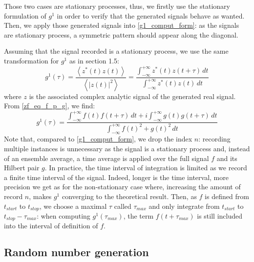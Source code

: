 \documentclass[12pt]{report}
\begin{document}
Those two cases are stationary processes, thus, we firstly use the stationary formulation of $g^1$ in order to verify that the generated signals behave as wanted. Then, we apply those generated signals into \eqref{g1_comput_form}: as the signals are stationary process, a symmetric pattern should appear along the diagonal.

Assuming that the signal recorded is a stationary process, we use the same transformation for $g^1$ as in section 1.5:
\begin{equation}
g^1(\tau) = \frac{\left\langle z^*(t)z(t) \right\rangle}{\left\langle \vert z(t) \vert ^2 \right\rangle} = \frac{\int_{-\infty}^{+\infty} z^*(t)z(t + \tau)\, dt}{\int_{-\infty}^{+\infty} z^*(t)z(t) \, dt}
\end{equation}
where $z$ is the associated complex analytic signal of the generated real signal. From \eqref{zf_eq_f_p_g}, we find:
\begin{equation}
\label{g1_stattionary_computer}
g^1(\tau) = \frac{\int_{-\infty}^{+\infty} f(t)f(t + \tau)\, dt  + i \int_{-\infty}^{+\infty} g(t)g(t + \tau)\, dt}{\int_{-\infty}^{+\infty} f(t)^2 + g(t)^2 \, dt}
\end{equation}
Note that, compared to \eqref{g1_comput_form}, we drop the index $n$: recording multiple instances is unnecessary as the signal is a stationary process and, instead of an ensemble average, a time average is applied over the full signal $f$ and its Hilbert pair $g$. In practice, the time interval of integration is limited as we record a finite time interval of the signal. Indeed, longer is the time interval, more precision we get as for the non-stationary case where, increasing the amount of record $n$, makes $g^1$ converging to the theoretical result. Then, as $f$ is defined from $t_{start}$ to $t_{stop}$, we choose a maximal $\tau$ called $\tau_{max}$ and only integrate from $t_{start}$ to $t_{stop} - \tau_{max}$: when computing $g^1(\tau_{max})$, the term $f(t+\tau_{max})$ is still included into the interval of definition of $f$.

\subsection{Random number generation}
\end{document}
